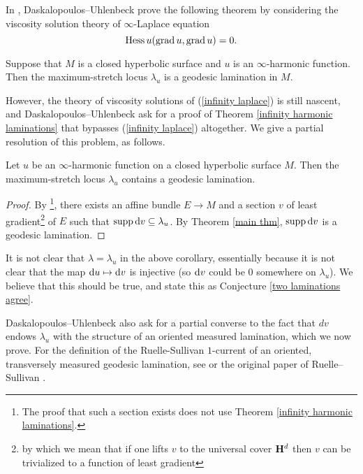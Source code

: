 In \cite[\S5]{daskalopoulos2020transverse}, Daskalopoulos--Uhlenbeck prove the following theorem by considering the viscosity solution theory of $\infty$-Laplace equation
\begin{equation}\label{infinity laplace}
    \operatorname{Hess} u(\operatorname{grad} u, \operatorname{grad} u) = 0.
\end{equation}

\begin{theorem}\label{infinity harmonic laminations}
Suppose that $M$ is a closed hyperbolic surface and $u$ is an $\infty$-harmonic function. Then the maximum-stretch locus $\lambda_u$ is a geodesic lamination in $M$.
\end{theorem}

However, the theory of viscosity solutions of (\ref{infinity laplace}) is still nascent, and Daskalopoulos--Uhlenbeck ask for a proof of Theorem \ref{infinity harmonic laminations} that bypasses (\ref{infinity laplace}) altogether.
We give a partial resolution of this problem, as follows.

\begin{corollary}\label{maximum stretch contains lamination}
Let $u$ be an $\infty$-harmonic function on a closed hyperbolic surface $M$.
Then the maximum-stretch locus $\lambda_u$ contains a geodesic lamination.
\end{corollary}
\begin{proof}
By \cite[\S6]{daskalopoulos2020transverse}\footnote{The proof that such a section exists does not use Theorem \ref{infinity harmonic laminations}.}, there exists an affine bundle $E \to M$ and a section $v$ of least gradient\footnote{by which we mean that if one lifts $v$ to the universal cover $\mathbf H^d$ then $v$ can be trivialized to a function of least gradient} of $E$ such that $\operatorname{supp} \mathop{}\!\mathrm{d} v \subseteq \lambda_u$.
By Theorem \ref{main thm}, $\operatorname{supp} \mathop{}\!\mathrm{d} v$ is a geodesic lamination.
\end{proof}

It is not clear that $\lambda = \lambda_u$ in the above corollary, essentially because it is not clear that the map $\mathop{}\!\mathrm{d} u \mapsto \mathop{}\!\mathrm{d} v$ is injective (so $\mathop{}\!\mathrm{d} v$ could be $0$ somewhere on $\lambda_u$).
We believe that this should be true, and state this as Conjecture \ref{two laminations agree}.

Daskalopoulos--Uhlenbeck also ask for a partial converse to the fact that $dv$ endows $\lambda_u$ with the structure of an oriented measured lamination, which we now prove. For the definition of the Ruelle-Sullivan $1$-current of an oriented, transversely measured geodesic lamination, see \cite[\S8]{daskalopoulos2020transverse} or the original paper of Ruelle--Sullivan \cite{Ruelle75}.

